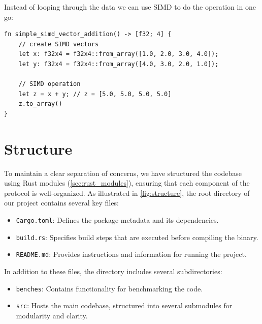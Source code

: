 \documentclass[11pt]{report}
\theoremstyle{definition}
\theoremstyle{plain}
\begin{document}
Instead of looping through the data we can use SIMD to do the operation in one go:

\begin{verbatim}
fn simple_simd_vector_addition() -> [f32; 4] {
    // create SIMD vectors
    let x: f32x4 = f32x4::from_array([1.0, 2.0, 3.0, 4.0]);
    let y: f32x4 = f32x4::from_array([4.0, 3.0, 2.0, 1.0]);

    // SIMD operation
    let z = x + y; // z = [5.0, 5.0, 5.0, 5.0]
    z.to_array()
}
\end{verbatim}



\section{Structure}
To maintain a clear separation of concerns, we have structured the codebase using Rust modules (\autoref{sec:rust_modules}), ensuring that each component of the protocol is well-organized. As illustrated in \autoref{fig:structure}, the root directory of our project contains several key files:

\begin{itemize}
  \item \texttt{Cargo.toml}: Defines the package metadata and its dependencies.
  \item \texttt{build.rs}: Specifies build steps that are executed before compiling the binary.
  \item \texttt{README.md}: Provides instructions and information for running the project.
\end{itemize}

In addition to these files, the directory includes several subdirectories:

\begin{itemize}
  \item \texttt{benches}: Contains functionality for benchmarking the code.
  \item \texttt{src}: Hosts the main codebase, structured into several submodules for modularity and clarity.
\end{itemize}
\end{document}

